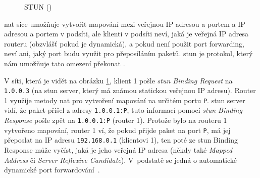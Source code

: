 \begin{figure}[H]
    \centering
    \caption{STUN (\publicPrivateIP)}
    \label{stunFig}
\end{figure}

\gls{nat} sice umožňuje vytvořit mapování mezi veřejnou IP adresou a portem a IP
adresou a portem v podsíti, ale klienti v podsíti neví, jaká je veřejná IP
adresa routeru (obzvlášť pokud je dynamická), a pokud není použit port
forwarding, neví ani, jaký port budu využit pro přeposíláním paketů. \gls{stun}
je protokol, který nám umožňuje tato omezení překonat
\parencite{WebRTCForTheCurious}.

V síti, která je vidět na obrázku \ref{stunFig}, klient 1 pošle
\textit{\gls{stun} Binding Request} na \texttt{1.0.0.3} (na
\gls{stun} server, který má známou statickou veřejnou IP adresu). Router 1
využije metody \gls{nat} pro vytvoření mapování na určitém portu
\texttt{P}. \gls{stun} server vidí, že paket přišel z adresy
\texttt{1.0.0.1:P}, tuto informací pomocí \textit{\gls{stun}
    Binding Response} pošle zpět na \texttt{1.0.0.1:P} (router 1).
Protože bylo na routeru 1 vytvořeno mapování, router 1 ví, že pokud přijde
paket na port \texttt{P}, má jej přeposlat na IP adresu
\texttt{192.168.0.1} (klientovi 1), ten poté ze \gls{stun} Binding
Response může vyčíst, jaká je jeho veřejná IP adresa (někdy také
\textit{Mapped Address} či \textit{Server Reflexive Candidate}). V~podstatě
se jedná o automatické dynamické port
forwardování~\parencite{WebRTCForTheCurious}.

